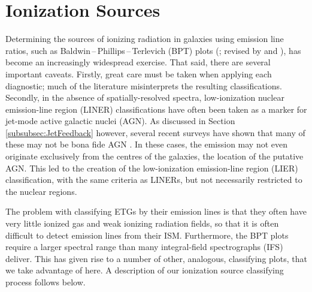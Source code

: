 \section{Ionization Sources}
	\label{sec:Diagnostics}
	Determining the sources of ionizing radiation in galaxies using emission line ratios, such as Baldwin\,--\,Phillips\,--\,Terlevich (BPT) plots (\citealt{Baldwin1981}; revised by \citealt{Kewley2001, Kewley2006} and \citealt{Kauffmann2003a}), has become an increasingly widespread exercise. That said, there are several important caveats. Firstly, great care must be taken when applying each diagnostic; much of the literature misinterprets the resulting classifications. Secondly, in the absence of spatially-resolved spectra, low-ionization nuclear emission-line region (LINER) classifications have often been taken as a marker for jet-mode active galactic nuclei (AGN). As discussed in Section \ref{subsubsec:JetFeedback} however, several recent surveys have shown that many of these may not be bona fide AGN \citep[e.g.][]{Sarzi2005, Sarzi2010, Singh2013, Belfiore2016a}. In these cases, the emission may not even originate exclusively from the centres of the galaxies, the location of the putative AGN. This led to the creation of the low-ionization emission-line region (LIER) classification, with the same criteria as LINERs, but not necessarily restricted to the nuclear regions.

	The problem with classifying ETGs by their emission lines is that they often have very little ionized gas and weak ionizing radiation fields, so that it is often difficult to detect emission lines from their ISM. Furthermore, the BPT plots require a larger spectral range than many integral-field spectrographs (IFS) deliver. This has given rise to a number of other, analogous, classifying plots, that we take advantage of here. A description of our ionization source classifying process follows below. 

